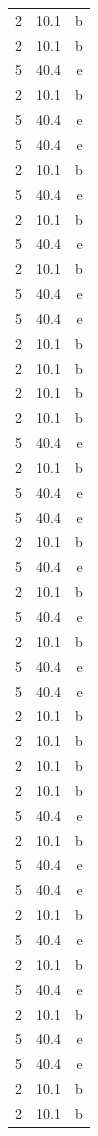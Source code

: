 \documentclass{article}
\begin{document}
\begin{longtable}[c]{l|S|r}
	2 & 10.1 & b \\ 
	2 & 10.1 & b \\ 
	5 & 40.4 & e \\ 
	2 & 10.1 & b \\ 
	5 & 40.4 & e \\ 
	5 & 40.4 & e \\ 
	2 & 10.1 & b \\ 
	5 & 40.4 & e \\ 
	2 & 10.1 & b \\ 
	5 & 40.4 & e \\ 
	2 & 10.1 & b \\ 
	5 & 40.4 & e \\ 
	5 & 40.4 & e \\ 
	2 & 10.1 & b \\ 
	2 & 10.1 & b \\ 
	2 & 10.1 & b \\ 
	2 & 10.1 & b \\ 
	5 & 40.4 & e \\ 
	2 & 10.1 & b \\ 
	5 & 40.4 & e \\ 
	5 & 40.4 & e \\ 
	2 & 10.1 & b \\ 
	5 & 40.4 & e \\ 
	2 & 10.1 & b \\ 
	5 & 40.4 & e \\ 
	2 & 10.1 & b \\ 
	5 & 40.4 & e \\ 
	5 & 40.4 & e \\ 
	2 & 10.1 & b \\ 
	2 & 10.1 & b \\ 
	2 & 10.1 & b \\ 
	2 & 10.1 & b \\ 
	5 & 40.4 & e \\ 
	2 & 10.1 & b \\ 
	5 & 40.4 & e \\ 
	5 & 40.4 & e \\ 
	2 & 10.1 & b \\ 
	5 & 40.4 & e \\ 
	2 & 10.1 & b \\ 
	5 & 40.4 & e \\ 
	2 & 10.1 & b \\ 
	5 & 40.4 & e \\ 
	5 & 40.4 & e \\ 
	2 & 10.1 & b \\ 
	2 & 10.1 & b \\ 

\end{longtable}
\end{document}
